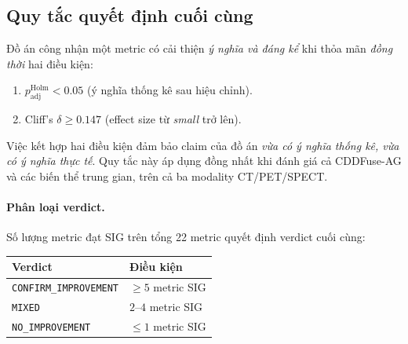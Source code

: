 \subsection{Quy tắc quyết định cuối cùng}
\label{ssec:decision-rule}

Đồ án công nhận một metric có cải thiện \emph{ý nghĩa và đáng kể} khi thỏa mãn \emph{đồng thời} hai điều kiện:
\begin{enumerate}\itemsep0pt
    \item $p_{\mathrm{adj}}^{\mathrm{Holm}} < 0.05$ (ý nghĩa thống kê sau hiệu chỉnh).
    \item Cliff's $\delta \ge 0.147$ (effect size từ \emph{small} trở lên).
\end{enumerate}
Việc kết hợp hai điều kiện đảm bảo claim của đồ án \emph{vừa có ý nghĩa thống kê, vừa có ý nghĩa thực tế}. Quy tắc này áp dụng đồng nhất khi đánh giá cả CDDFuse-AG và các biến thể trung gian, trên cả ba modality CT/PET/SPECT.

\paragraph{Phân loại verdict.}
Số lượng metric đạt SIG trên tổng 22 metric quyết định verdict cuối cùng:
\begin{center}
\begin{tabular}{ll}
\toprule
\textbf{Verdict} & \textbf{Điều kiện} \\
\midrule
\texttt{CONFIRM\_IMPROVEMENT}  & $\ge 5$ metric SIG \\
\texttt{MIXED}                 & $2$--$4$ metric SIG \\
\texttt{NO\_IMPROVEMENT}       & $\le 1$ metric SIG \\
\bottomrule
\end{tabular}
\end{center}
